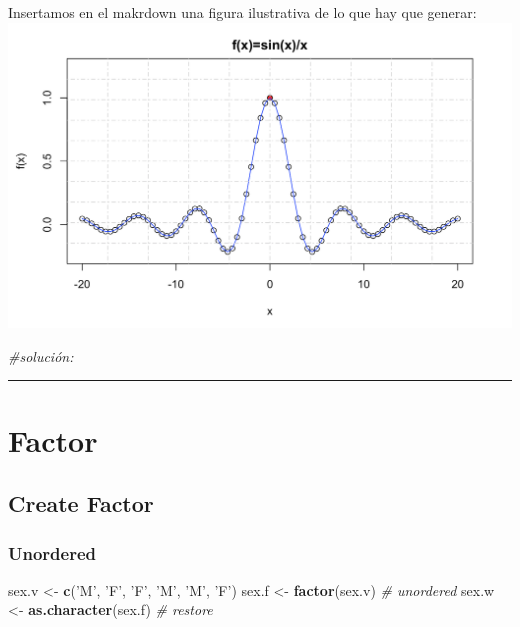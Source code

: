 \documentclass[
]{article}
\newenvironment{Shaded}{\begin{snugshade}}{\end{snugshade}}
\newcommand{\CommentTok}[1]{\textcolor[rgb]{0.56,0.35,0.01}{\textit{#1}}}
\newcommand{\KeywordTok}[1]{\textcolor[rgb]{0.13,0.29,0.53}{\textbf{#1}}}
\newcommand{\NormalTok}[1]{#1}
\newcommand{\StringTok}[1]{\textcolor[rgb]{0.31,0.60,0.02}{#1}}
\begin{document}
Insertamos en el makrdown una figura ilustrativa de lo que hay que
generar:\\
\includegraphics{sinxx.png}

\begin{Shaded}
\begin{Highlighting}[]
\CommentTok{#solución:}
\end{Highlighting}
\end{Shaded}

\begin{center}\rule{0.5\linewidth}{0.5pt}\end{center}

\hypertarget{factor}{%
\section{Factor}\label{factor}}

\hypertarget{create-factor}{%
\subsection{Create Factor}\label{create-factor}}

\hypertarget{unordered}{%
\subsubsection{Unordered}\label{unordered}}

\begin{Shaded}
\begin{Highlighting}[]
\NormalTok{sex.v <-}\StringTok{ }\KeywordTok{c}\NormalTok{(}\StringTok{'M'}\NormalTok{, }\StringTok{'F'}\NormalTok{, }\StringTok{'F'}\NormalTok{, }\StringTok{'M'}\NormalTok{, }\StringTok{'M'}\NormalTok{, }\StringTok{'F'}\NormalTok{)}
\NormalTok{sex.f <-}\StringTok{ }\KeywordTok{factor}\NormalTok{(sex.v) }\CommentTok{# unordered}
\NormalTok{sex.w <-}\StringTok{ }\KeywordTok{as.character}\NormalTok{(sex.f) }\CommentTok{# restore}
\end{Highlighting}
\end{Shaded}
\end{document}
